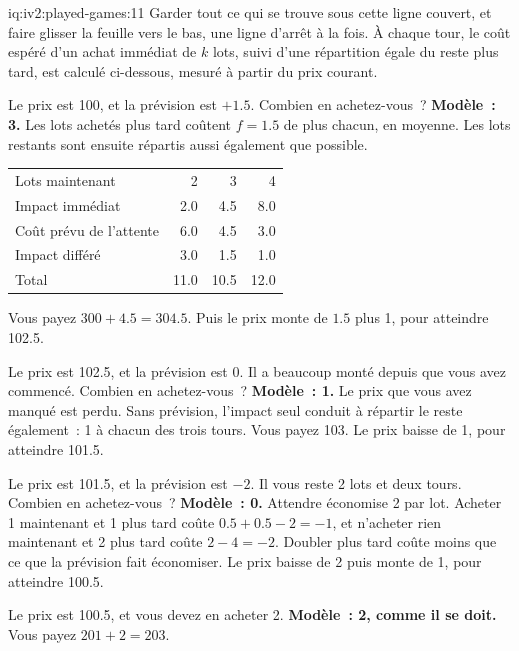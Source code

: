 \begin{solution}{iq:iv2:played-games:11}
Garder tout ce qui se trouve sous cette ligne couvert, et faire glisser la feuille vers le bas, une ligne d'arrêt à la fois. À chaque tour, le coût espéré d'un achat immédiat de $k$ lots, suivi d'une répartition égale du reste plus tard, est calculé ci-dessous, mesuré à partir du prix courant.

Le prix est 100, et la prévision est $+1.5$. Combien en achetez-vous~?
\ivstop
\textbf{Modèle~: 3.} Les lots achetés plus tard coûtent $f = 1.5$ de plus chacun, en moyenne. Les lots restants sont ensuite répartis aussi également que possible.
\begin{center}\small
\begin{tabular}{@{}l*{3}{r}@{}}
Lots maintenant & 2 & 3 & 4 \\
Impact immédiat & 2.0 & 4.5 & 8.0 \\
Coût prévu de l'attente & 6.0 & 4.5 & 3.0 \\
Impact différé & 3.0 & 1.5 & 1.0 \\ \hline
Total & 11.0 & 10.5 & 12.0
\end{tabular}
\end{center}
Vous payez $300 + 4.5 = 304.5$. Puis le prix monte de $1.5$ plus 1, pour atteindre 102.5.

Le prix est 102.5, et la prévision est 0. Il a beaucoup monté depuis que vous avez commencé. Combien en achetez-vous~?
\ivstop
\textbf{Modèle~: 1.} Le prix que vous avez manqué est perdu. Sans prévision, l'impact seul conduit à répartir le reste également~: 1 à chacun des trois tours. Vous payez 103. Le prix baisse de 1, pour atteindre 101.5.

Le prix est 101.5, et la prévision est $-2$. Il vous reste 2 lots et deux tours. Combien en achetez-vous~?
\ivstop
\textbf{Modèle~: 0.} Attendre économise 2 par lot. Acheter 1 maintenant et 1 plus tard coûte $0.5 + 0.5 - 2 = -1$, et n'acheter rien maintenant et 2 plus tard coûte $2 - 4 = -2$. Doubler plus tard coûte moins que ce que la prévision fait économiser. Le prix baisse de 2 puis monte de 1, pour atteindre 100.5.

Le prix est 100.5, et vous devez en acheter 2.
\ivstop
\textbf{Modèle~: 2, comme il se doit.} Vous payez $201 + 2 = 203$.


\end{solution}
